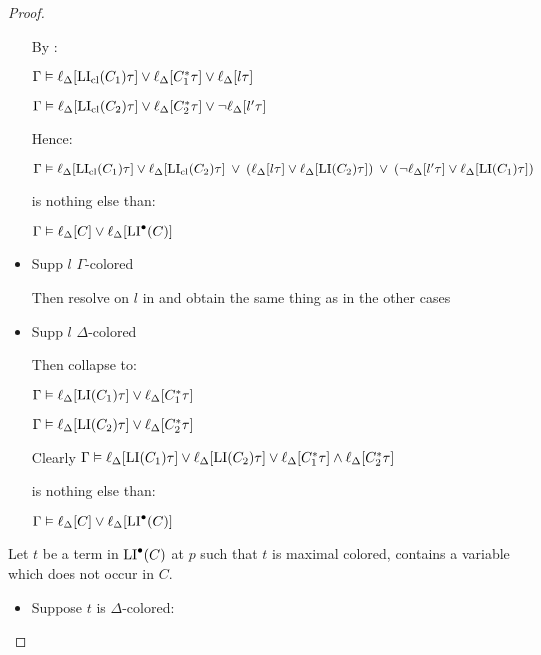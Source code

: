 \documentclass[,%
	draft=false,%
	numbers=noendperiod
	11pt,
	a4paper,
	oneside,%
	openany,
]{memoir}
\begin{document}
\begin{proof}
\begin{itemize}


			By \markA\markB:

			$\Gamma \vDash \ell_{\Delta}[\operatorname{LI}_{\operatorname{cl}}(C_1)\tau] \lor
			\ell_{\Delta}[C_1^*\tau] \lor
			\ell_{\Delta}[l\tau]$

			$\Gamma \vDash \ell_{\Delta}[\operatorname{LI}_{\operatorname{cl}}(C_2)\tau] \lor
			\ell_{\Delta}[C_2^*\tau] \lor
			\lnot\ell_{\Delta}[l'\tau]$

			Hence:

			$\Gamma \vDash
			\ell_{\Delta}[\operatorname{LI}_{\operatorname{cl}}(C_1)\tau] \lor
			\ell_{\Delta}[\operatorname{LI}_{\operatorname{cl}}(C_2)\tau] 
			\;\,{\lor}\;\, (\ell_{\Delta}[l\tau] \lor \ell_{\Delta}[\operatorname{LI}(C_2)\tau]) 
			\;\,{\lor}\;\, (\lnot\ell_{\Delta}[l'\tau] \lor \ell_{\Delta}[\operatorname{LI}(C_1)\tau])$

			is nothing else than:

			$\Gamma\vDash \ell_{\Delta}[C] \lor \ell_{\Delta}[\operatorname{LI}^\bullet(C)]$

		\item Supp $l$ $\Gamma$-colored

			Then resolve on $l$ in \markA\markB{} and obtain the same thing as in the other cases

		\item Supp $l$ $\Delta$-colored

			Then \markA\markB{} collapse to:

			$\Gamma \vDash \ell_{\Delta}[\operatorname{LI}(C_1)\tau] \lor
			\ell_{\Delta}[C_1^*\tau]$

			$\Gamma \vDash \ell_{\Delta}[\operatorname{LI}(C_2)\tau] \lor
			\ell_{\Delta}[C_2^*\tau]$

			Clearly 
			$\Gamma \vDash \ell_{\Delta}[\operatorname{LI}(C_1)\tau] \lor \ell_{\Delta}[\operatorname{LI}(C_2)\tau] \lor
			\ell_{\Delta}[C_1^*\tau] \land \ell_{\Delta}[C_2^*\tau] $

			is nothing else than:

			$\Gamma\vDash \ell_{\Delta}[C] \lor \ell_{\Delta}[\operatorname{LI}^\bullet(C)]$


	\end{itemize}

	Let $t$ be a term in $\operatorname{LI}^\bullet(C)$ at $p$ such that $t$ is maximal colored, contains a variable which does not occur in $C$.\nopagebreak
	\begin{itemize}
		\item Suppose $t$ is $\Delta$-colored:


\end{itemize}
\end{proof}
\end{document}
